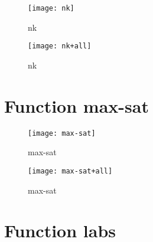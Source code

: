 \begin{center}

\end{center}

\begin{center}

\end{center}

\begin{figure}[h]
\begin{center}
\texttt{[image: nk]}
\caption{nk}
\end{center}
\end{figure}

\begin{figure}[h]
\begin{center}
\texttt{[image: nk+all]}
\caption{nk}
\end{center}
\end{figure}

\newpage

\section{Function max-sat}

\begin{center}

\end{center}

\begin{center}

\end{center}

\begin{figure}[h]
\begin{center}
\texttt{[image: max-sat]}
\caption{max-sat}
\end{center}
\end{figure}

\begin{figure}[h]
\begin{center}
\texttt{[image: max-sat+all]}
\caption{max-sat}
\end{center}
\end{figure}

\newpage

\section{Function labs}

\begin{center}

\end{center}


